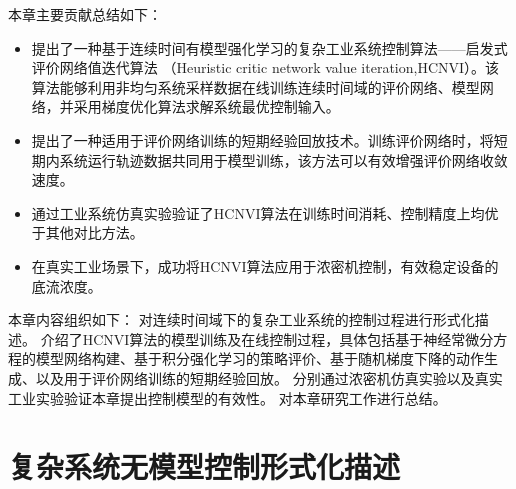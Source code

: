 本章主要贡献总结如下：
\begin{itemize}[nosep]
\item  提出了一种基于连续时间有模型强化学习的复杂工业系统控制算法——启发式评价网络值迭代算法
（Heuristic critic network value iteration,HCNVI）。该算法能够利用非均匀系统采样数据在线训练连续时间域的评价网络、模型网络，并采用梯度优化算法求解系统最优控制输入。
\item  提出了一种适用于评价网络训练的短期经验回放技术。训练评价网络时，将短期内系统运行轨迹数据共同用于模型训练，该方法可以有效增强评价网络收敛速度。
\item  通过工业系统仿真实验验证了HCNVI算法在训练时间消耗、控制精度上均优于其他对比方法。
\item  在真实工业场景下，成功将HCNVI算法应用于浓密机控制，有效稳定设备的底流浓度。
\end{itemize}

本章内容组织如下： 
对连续时间域下的复杂工业系统的控制过程进行形式化描述。
介绍了HCNVI算法的模型训练及在线控制过程，具体包括基于神经常微分方程的模型网络构建、基于积分强化学习的策略评价、基于随机梯度下降的动作生成、以及用于评价网络训练的短期经验回放。
分别通过浓密机仿真实验以及真实工业实验验证本章提出控制模型的有效性。
对本章研究工作进行总结。

\section{复杂系统无模型控制形式化描述}
\label{sec:formulation}

